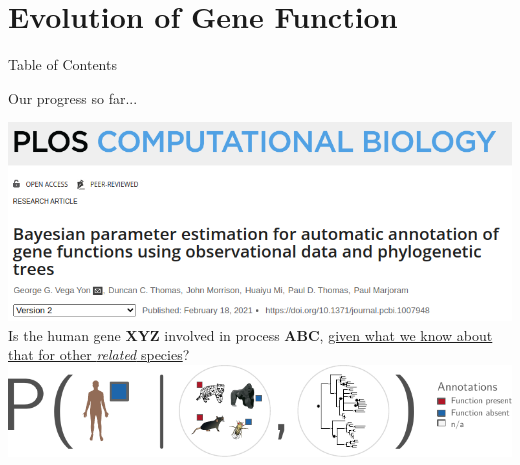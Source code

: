 \documentclass[10pt,aspectratio=169]{beamer}
\newcounter{frame}[frame]
\newcommand{\toc}[0]{\begin{frame}{Table of Contents}
    \tableofcontents[current]
\end{frame}}
\begin{document}
\section{Evolution of Gene Function}
\toc{}

	
	
	


\begin{frame}[c,label=aphylo-prob-diagram]{Our progress so far...}
\begin{center}
    \includegraphics[width=.6\linewidth]{fig/aphylo-plos-comp-bio.png}
\vfill
    \normalsize Is the human gene \textbf{XYZ} involved in process \textbf{ABC}, \uline{given what we know about that for other \textit{related} species}?
\vfill
    \includegraphics[width=.8\linewidth, clip, trim={0 0 0 0}]{aphylo-data-probability.pdf}
\end{center}
\end{frame}
\end{document}

